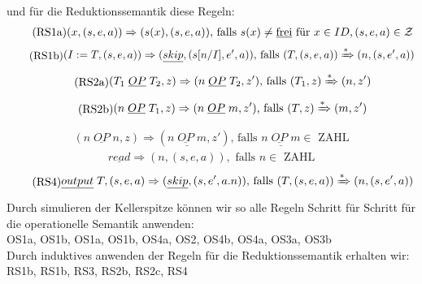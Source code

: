 \documentclass[ngerman,a4paper]{report}
\begin{document}
und für die Reduktionssemantik diese  Regeln:
\begin{equation}
\tag{RS1a}
\begin{split}
(x,(s,e,a)) \Rightarrow (s(x), (s,e,a))\text{, falls }s(x) \neq \text{\underline{frei}}\text{ für }x \in ID, (s,e,a) \in \mathcal{Z}
\end{split}
\label{eqn:RS1a}
\end{equation}
\begin{equation}
\tag{RS1b}
\begin{split}
(I:=T,(s,e,a)) \Rightarrow (\underline{skip}, (s[n/I],e',a))\text{, falls }(T, (s,e,a))\xRightarrow{*}(n,(s,e',a))
\end{split}
\label{eqn:RS1b}
\end{equation}
\begin{equation}
\tag{RS2a}
\begin{split}
(T_1\;\underline{OP}\;T_2, z) \Rightarrow (n\;\underline{OP}\;T_2, z')\text{, falls }(T_1, z) \xRightarrow{*}(n,z')
\end{split}
\label{eqn:RS2a}
\end{equation}	
\begin{equation}
\tag{RS2b}
\begin{split}
(n\;\underline{OP}\;T_1, z) \Rightarrow (n\;\underline{OP}\;m, z')\text{, falls }(T, z) \xRightarrow{*}(m,z')
\end{split}
\label{eqn:RS2b}
\end{equation}
\begin{equation}
\tag{RS2c}
\begin{split}
(n\;\underline{OP}\;n, z) \Rightarrow (\underline{n\;\underline{OP}\;m}, z')\text{, falls }\underline{n\;\underline{OP}\;m} \in\text{ ZAHL}
\end{split}
\label{eqn:RS2c}
\end{equation}
\begin{equation}
\tag{RS3}
\begin{split}
\underline{read} \Rightarrow (n, (s,e,a)), \text{ falls } n \in\text{ ZAHL}
\end{split}
\label{eqn:RS3}
\end{equation}
\begin{equation}
\tag{RS4}
\begin{split}
\underline{output}\;T, (s,e,a)\Rightarrow (\underline{skip}, (s,e',a.n))\text{, falls }(T, (s,e,a))\xRightarrow{*}(n,(s,e',a))
\end{split}
\label{eqn:RS4}
\end{equation}
Durch simulieren der Kellerspitze können wir so alle Regeln Schritt für Schritt für die operationelle Semantik anwenden:\\
OS1a, OS1b, OS1a, OS1b, OS4a, OS2, OS4b, OS4a, OS3a, OS3b\\
Durch induktives anwenden der Regeln für die Reduktionssemantik erhalten wir:\\
RS1b, RS1b, RS3, RS2b, RS2c, RS4\\
\end{document}
